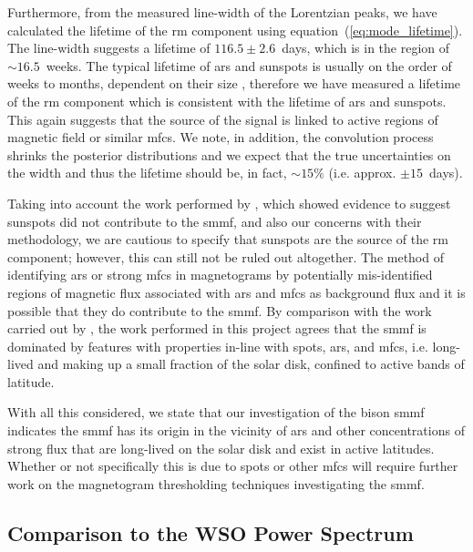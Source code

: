 Furthermore, from the measured line-width of the Lorentzian peaks, we have calculated the lifetime of the \gls{rm} component using equation~(\ref{eq:mode_lifetime}). The line-width suggests a lifetime of $116.5 \pm 2.6$~days, which is in the region of $\sim 16.5$~weeks. The typical lifetime of \glspl{ar} and sunspots is usually on the order of weeks to months, dependent on their size \citep{zwaan_solar_1981, schrijver_photospheric_1994, howard_sunspot_2001, hathaway_sunspot_2008, van_driel-gesztelyi_evolution_2015}, therefore we have measured a lifetime of the \gls{rm} component which is consistent with the lifetime of \glspl{ar} and sunspots. This again suggests that the source of the signal is linked to active regions of magnetic field or similar \glspl{mfc}. We note, in addition, the convolution process shrinks the posterior distributions and we expect that the true uncertainties on the width and thus the lifetime should be, in fact, $\sim 15\%$ (i.e. approx. $\pm 15$~days).

Taking into account the work performed by \citet{bose_variability_2018}, which showed evidence to suggest sunspots did not contribute to the \gls{smmf}, and also our concerns with their methodology, we are cautious to specify that sunspots are the source of the \gls{rm} component; however, this can still not be ruled out altogether. The method of identifying \glspl{ar} or strong \glspl{mfc} in magnetograms by \citet{bose_variability_2018} potentially mis-identified regions of magnetic flux associated with \glspl{ar} and \glspl{mfc} as background flux and it is possible that they do contribute to the \gls{smmf}. By comparison with the work carried out by \citet{kutsenko_contribution_2017}, the work performed in this project agrees that the \gls{smmf} is dominated by features with properties in-line with spots, \glspl{ar}, and \glspl{mfc}, i.e. long-lived and making up a small fraction of the solar disk, confined to active bands of latitude.

With all this considered, we state that our investigation of the \gls{bison} \gls{smmf} indicates the \gls{smmf} has its origin in the vicinity of \glspl{ar} and other concentrations of strong flux that are long-lived on the solar disk and exist in active latitudes. Whether or not specifically this is due to spots or other \glspl{mfc} will require further work on the magnetogram thresholding techniques investigating the \gls{smmf}.


\subsection{Comparison to the WSO Power Spectrum}\label{sec:WSO_reults}

